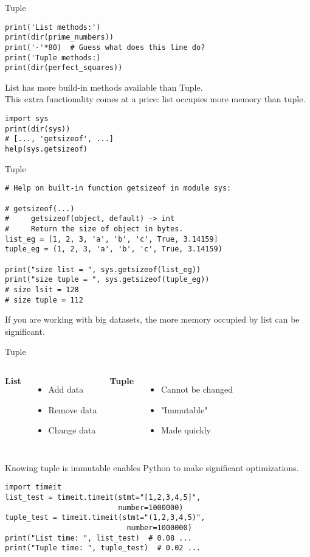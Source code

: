 \documentclass{beamer}
\begin{document}
\begin{frame}[fragile]{Tuple}
\begin{verbatim}
print('List methods:')
print(dir(prime_numbers))
print('-'*80)  # Guess what does this line do?
print('Tuple methods:)
print(dir(perfect_squares))
\end{verbatim}
List has more build-in methods available than Tuple.\\
This extra functionality comes at a price: list occupies more
memory than tuple.
\begin{verbatim}
import sys
print(dir(sys))
# [..., 'getsizeof', ...]
help(sys.getsizeof)
\end{verbatim}
\end{frame}

\begin{frame}[fragile]{Tuple}
\begin{verbatim}
# Help on built-in function getsizeof in module sys:

# getsizeof(...)
#     getsizeof(object, default) -> int
#     Return the size of object in bytes.
list_eg = [1, 2, 3, 'a', 'b', 'c', True, 3.14159]
tuple_eg = (1, 2, 3, 'a', 'b', 'c', True, 3.14159)

print("size list = ", sys.getsizeof(list_eg))
print("size tuple = ", sys.getsizeof(tuple_eg))
# size lsit = 128
# size tuple = 112
\end{verbatim}
If you are working with big datasets, the more memory 
occupied by list can be significant.
\end{frame}

\begin{frame}[fragile]{Tuple}
\begin{columns}[T]
\textbf{List}
\begin{itemize}
\item Add data
\item Remove data
\item Change data
\end{itemize}
\textbf{Tuple}
\begin{itemize}
\item Cannot be changed
\item "Immutable"
\item Made quickly
\end{itemize}
\end{columns}
\vspace{10pt}
Knowing tuple is immutable enables Python to make 
significant optimizations.
\begin{verbatim}
import timeit
list_test = timeit.timeit(stmt="[1,2,3,4,5]", 
                          number=1000000)
tuple_test = timeit.timeit(stmt="(1,2,3,4,5)",
                            number=1000000)
print("List time: ", list_test)  # 0.08 ...
print("Tuple time: ", tuple_test)  # 0.02 ...
\end{verbatim}
\end{frame}
\end{document}
